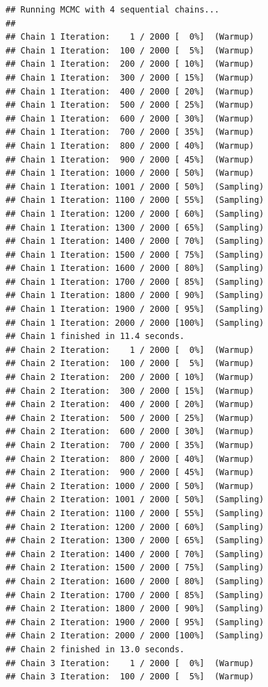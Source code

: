 \documentclass[
]{article}
\begin{document}
\begin{verbatim}
## Running MCMC with 4 sequential chains...
## 
## Chain 1 Iteration:    1 / 2000 [  0%]  (Warmup) 
## Chain 1 Iteration:  100 / 2000 [  5%]  (Warmup) 
## Chain 1 Iteration:  200 / 2000 [ 10%]  (Warmup) 
## Chain 1 Iteration:  300 / 2000 [ 15%]  (Warmup) 
## Chain 1 Iteration:  400 / 2000 [ 20%]  (Warmup) 
## Chain 1 Iteration:  500 / 2000 [ 25%]  (Warmup) 
## Chain 1 Iteration:  600 / 2000 [ 30%]  (Warmup) 
## Chain 1 Iteration:  700 / 2000 [ 35%]  (Warmup) 
## Chain 1 Iteration:  800 / 2000 [ 40%]  (Warmup) 
## Chain 1 Iteration:  900 / 2000 [ 45%]  (Warmup) 
## Chain 1 Iteration: 1000 / 2000 [ 50%]  (Warmup) 
## Chain 1 Iteration: 1001 / 2000 [ 50%]  (Sampling) 
## Chain 1 Iteration: 1100 / 2000 [ 55%]  (Sampling) 
## Chain 1 Iteration: 1200 / 2000 [ 60%]  (Sampling) 
## Chain 1 Iteration: 1300 / 2000 [ 65%]  (Sampling) 
## Chain 1 Iteration: 1400 / 2000 [ 70%]  (Sampling) 
## Chain 1 Iteration: 1500 / 2000 [ 75%]  (Sampling) 
## Chain 1 Iteration: 1600 / 2000 [ 80%]  (Sampling) 
## Chain 1 Iteration: 1700 / 2000 [ 85%]  (Sampling) 
## Chain 1 Iteration: 1800 / 2000 [ 90%]  (Sampling) 
## Chain 1 Iteration: 1900 / 2000 [ 95%]  (Sampling) 
## Chain 1 Iteration: 2000 / 2000 [100%]  (Sampling) 
## Chain 1 finished in 11.4 seconds.
## Chain 2 Iteration:    1 / 2000 [  0%]  (Warmup) 
## Chain 2 Iteration:  100 / 2000 [  5%]  (Warmup) 
## Chain 2 Iteration:  200 / 2000 [ 10%]  (Warmup) 
## Chain 2 Iteration:  300 / 2000 [ 15%]  (Warmup) 
## Chain 2 Iteration:  400 / 2000 [ 20%]  (Warmup) 
## Chain 2 Iteration:  500 / 2000 [ 25%]  (Warmup) 
## Chain 2 Iteration:  600 / 2000 [ 30%]  (Warmup) 
## Chain 2 Iteration:  700 / 2000 [ 35%]  (Warmup) 
## Chain 2 Iteration:  800 / 2000 [ 40%]  (Warmup) 
## Chain 2 Iteration:  900 / 2000 [ 45%]  (Warmup) 
## Chain 2 Iteration: 1000 / 2000 [ 50%]  (Warmup) 
## Chain 2 Iteration: 1001 / 2000 [ 50%]  (Sampling) 
## Chain 2 Iteration: 1100 / 2000 [ 55%]  (Sampling) 
## Chain 2 Iteration: 1200 / 2000 [ 60%]  (Sampling) 
## Chain 2 Iteration: 1300 / 2000 [ 65%]  (Sampling) 
## Chain 2 Iteration: 1400 / 2000 [ 70%]  (Sampling) 
## Chain 2 Iteration: 1500 / 2000 [ 75%]  (Sampling) 
## Chain 2 Iteration: 1600 / 2000 [ 80%]  (Sampling) 
## Chain 2 Iteration: 1700 / 2000 [ 85%]  (Sampling) 
## Chain 2 Iteration: 1800 / 2000 [ 90%]  (Sampling) 
## Chain 2 Iteration: 1900 / 2000 [ 95%]  (Sampling) 
## Chain 2 Iteration: 2000 / 2000 [100%]  (Sampling) 
## Chain 2 finished in 13.0 seconds.
## Chain 3 Iteration:    1 / 2000 [  0%]  (Warmup) 
## Chain 3 Iteration:  100 / 2000 [  5%]  (Warmup) 

\end{verbatim}
\end{document}
